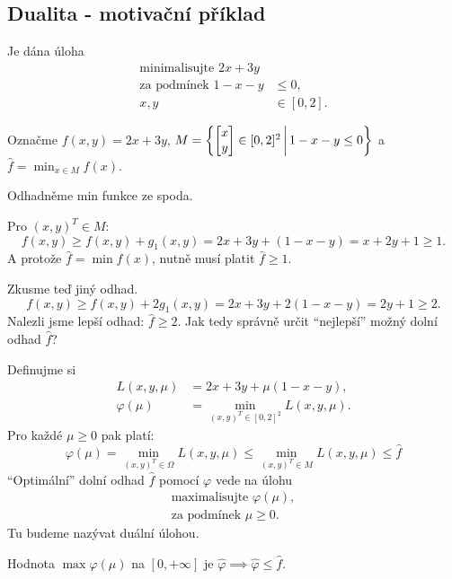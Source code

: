 \subsection{Dualita - motivační příklad}
Je dána úloha
\begin{align*}
    \text{minimalisujte } 2x+3y \\
    \text{za podmínek } 1-x-y &\leq 0, \\
    x,y &\in [0,2].
\end{align*}

Označme $f(x,y) = 2x + 3y$,
$
    M = \left\lbrace 
    \begin{bmatrix}
        x \\
        y
    \end{bmatrix} \in [0,2]^2 \, \middle| \, 1 - x - y \leq 0 \right\rbrace
$
a $\hat f = \min_{x\in M} f(x)$.

Odhadněme min funkce ze spoda. 

Pro $(x, y)^T \in M$: \[f(x, y) \geq f(x,y) + g_1(x,y) = 2x + 3y + (1-x-y) = x+2y+1 \geq 1.\]
A protože $\hat f = \min f(x)$, nutně musí platit $\hat f \geq 1$.

Zkusme teď jiný odhad.
\[f(x, y) \geq f(x,y) + 2g_1(x,y) = 2x + 3y + 2(1-x-y) = 2y + 1 \geq 2.\]
Nalezli jsme lepší odhad: $\hat f \geq 2$. Jak tedy správně určit \enquote{nejlepší} možný dolní odhad $\hat f$?

Definujme si
\begin{align*}
    L(x, y, \mu) &= 2x + 3y + \mu(1-x-y), \\
    \varphi(\mu) &= \min_{(x, y)^T \in [0,2]^2}L(x, y, \mu).
\end{align*}
Pro každé $\mu \geq 0$ pak platí:
\[
    \varphi(\mu) = \min_{(x, y)^T \in \Omega}L(x, y, \mu) \leq \min_{(x, y)^T \in M}L(x, y, \mu) \leq \hat f
\]
\enquote{Optimální} dolní odhad $\hat f$ pomocí $\varphi$ vede na úlohu
\begin{align*}
    \text{maximalisujte } \varphi(\mu), \\
    \text{za podmínek } \mu \geq 0.
\end{align*}
Tu budeme nazývat duální úlohou.

Hodnota $\max \varphi(\mu)$ na $[0, +\infty]$ je $\hat \varphi \implies \hat \varphi \leq \hat f$.
